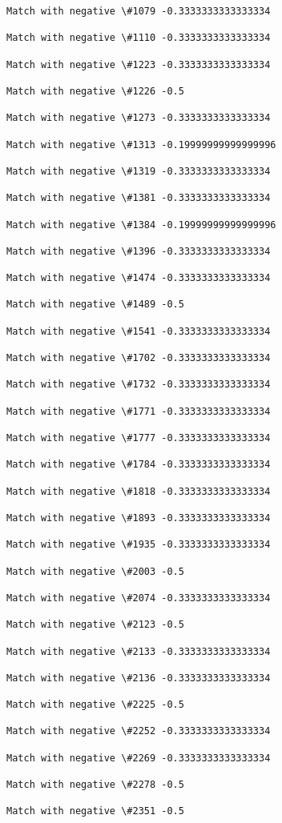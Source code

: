 \documentclass[11pt]{article}
\begin{document}
\begin{Verbatim}[commandchars=\\\{\}]
Match with negative \#1079 -0.3333333333333334

Match with negative \#1110 -0.3333333333333334

Match with negative \#1223 -0.3333333333333334

Match with negative \#1226 -0.5

Match with negative \#1273 -0.3333333333333334

Match with negative \#1313 -0.19999999999999996

Match with negative \#1319 -0.3333333333333334

Match with negative \#1381 -0.3333333333333334

Match with negative \#1384 -0.19999999999999996

Match with negative \#1396 -0.3333333333333334

Match with negative \#1474 -0.3333333333333334

Match with negative \#1489 -0.5

Match with negative \#1541 -0.3333333333333334

Match with negative \#1702 -0.3333333333333334

Match with negative \#1732 -0.3333333333333334

Match with negative \#1771 -0.3333333333333334

Match with negative \#1777 -0.3333333333333334

Match with negative \#1784 -0.3333333333333334

Match with negative \#1818 -0.3333333333333334

Match with negative \#1893 -0.3333333333333334

Match with negative \#1935 -0.3333333333333334

Match with negative \#2003 -0.5

Match with negative \#2074 -0.3333333333333334

Match with negative \#2123 -0.5

Match with negative \#2133 -0.3333333333333334

Match with negative \#2136 -0.3333333333333334

Match with negative \#2225 -0.5

Match with negative \#2252 -0.3333333333333334

Match with negative \#2269 -0.3333333333333334

Match with negative \#2278 -0.5

Match with negative \#2351 -0.5


\end{Verbatim}
\end{document}
